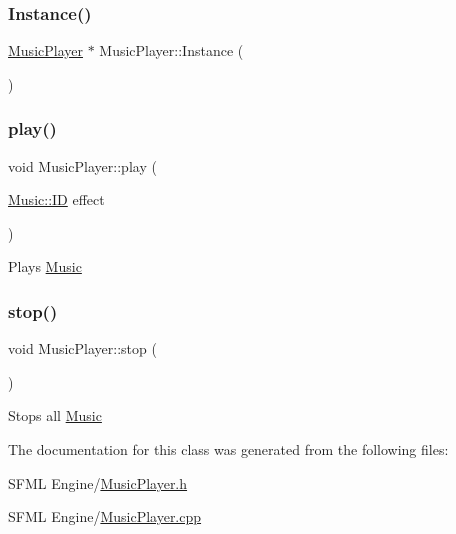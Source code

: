\subsubsection{\texorpdfstring{Instance()}{Instance()}}
{\footnotesize\ttfamily \hyperlink{class_music_player}{Music\+Player} $\ast$ Music\+Player\+::\+Instance (\begin{DoxyParamCaption}{ }\end{DoxyParamCaption})\hspace{0.3cm}{\ttfamily [static]}}

\mbox{\label{class_music_player_aa3273ed0e4d434993a80b04c1c5b9b97}} 
\subsubsection{\texorpdfstring{play()}{play()}}
{\footnotesize\ttfamily void Music\+Player\+::play (\begin{DoxyParamCaption}\item[{\hyperlink{namespace_music_ad5e0c8c2e2e7bdcbffbb125051531b86}{Music\+::\+ID}}]{effect }\end{DoxyParamCaption})}

Plays \hyperlink{namespace_music}{Music} \mbox{\label{class_music_player_a54e47a9e937730493d886aa5624c44d1}} 
\subsubsection{\texorpdfstring{stop()}{stop()}}
{\footnotesize\ttfamily void Music\+Player\+::stop (\begin{DoxyParamCaption}{ }\end{DoxyParamCaption})}

Stops all \hyperlink{namespace_music}{Music} 

The documentation for this class was generated from the following files\+:\begin{DoxyCompactItemize}
\item 
S\+F\+M\+L Engine/\hyperlink{_music_player_8h}{Music\+Player.\+h}\item 
S\+F\+M\+L Engine/\hyperlink{_music_player_8cpp}{Music\+Player.\+cpp}\end{DoxyCompactItemize}
